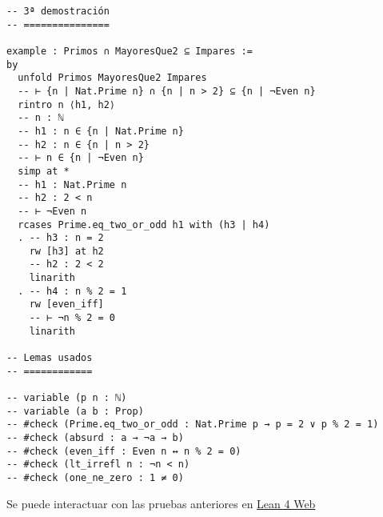 \begin{verbatim}
-- 3ª demostración
-- ===============

example : Primos ∩ MayoresQue2 ⊆ Impares :=
by
  unfold Primos MayoresQue2 Impares
  -- ⊢ {n | Nat.Prime n} ∩ {n | n > 2} ⊆ {n | ¬Even n}
  rintro n ⟨h1, h2⟩
  -- n : ℕ
  -- h1 : n ∈ {n | Nat.Prime n}
  -- h2 : n ∈ {n | n > 2}
  -- ⊢ n ∈ {n | ¬Even n}
  simp at *
  -- h1 : Nat.Prime n
  -- h2 : 2 < n
  -- ⊢ ¬Even n
  rcases Prime.eq_two_or_odd h1 with (h3 | h4)
  . -- h3 : n = 2
    rw [h3] at h2
    -- h2 : 2 < 2
    linarith
  . -- h4 : n % 2 = 1
    rw [even_iff]
    -- ⊢ ¬n % 2 = 0
    linarith

-- Lemas usados
-- ============

-- variable (p n : ℕ)
-- variable (a b : Prop)
-- #check (Prime.eq_two_or_odd : Nat.Prime p → p = 2 ∨ p % 2 = 1)
-- #check (absurd : a → ¬a → b)
-- #check (even_iff : Even n ↔ n % 2 = 0)
-- #check (lt_irrefl n : ¬n < n)
-- #check (one_ne_zero : 1 ≠ 0)
\end{verbatim}
Se puede interactuar con las pruebas anteriores en \href{https://lean.math.hhu.de/\#url=https://raw.githubusercontent.com/jaalonso/Calculemus2/main/src/Interseccion\_de\_los\_primos\_y\_los\_mayores\_que\_dos.lean}{Lean 4 Web}

